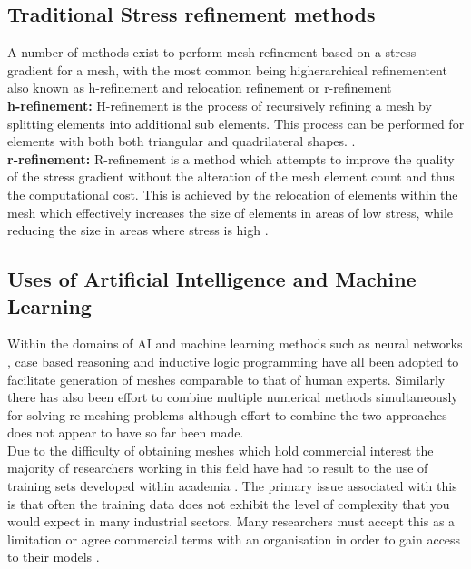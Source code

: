 \documentclass{article}
\begin{document}
\subsection{Traditional Stress refinement methods}

A number of methods exist to perform mesh refinement based on a stress gradient for a mesh, with the most common being higherarchical refinementent also known as h-refinement and relocation refinement or r-refinement\cite{HandPRefinements} \cite{RRefinement}\\ 

\noindent
\textbf{h-refinement: }
H-refinement is the process of recursively refining a mesh by splitting elements into additional sub elements. This process can be performed for elements with both both triangular and quadrilateral shapes. \cite{HandPRefinements}. \\ 

\noindent
\textbf{r-refinement: }
R-refinement is a method which attempts to improve the quality of the stress gradient without the alteration of the mesh element count and thus the computational cost. This is achieved by the relocation of elements within the mesh which effectively increases the size of elements in areas of low stress, while reducing the size in areas where stress is high \cite{RRefinement}.


\subsection{Uses of Artificial Intelligence and Machine Learning}

\noindent
Within the domains of AI and machine learning methods such as neural networks \cite{NeuralNetworks}, case based reasoning \cite{caseBasedReasoning} and inductive logic programming \cite{DolsakPaper94} have all been adopted to facilitate generation of meshes comparable to that of human experts.  Similarly there has also been effort to combine multiple numerical methods simultaneously for solving re meshing problems \cite{TraditionalHybridRefinement} although effort to combine the two approaches does not appear to have so far been made.\\ 

\noindent
Due to the difficulty of obtaining meshes which hold commercial interest the majority of researchers working in this field have had to result to the use of training sets developed within academia \cite{DolsakPaper91}. The primary issue associated with this is that often the training data does not exhibit the level of complexity that you would expect in many industrial sectors. Many researchers must accept this as a limitation or agree commercial terms with an organisation in order to gain access to their models \cite{DittmerMeshQualityMet}.\\ 
\end{document}
